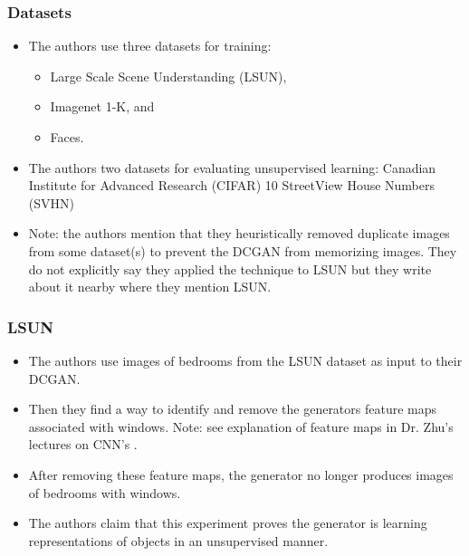 \documentclass{beamer}
\begin{document}
\begin{frame}[allowframebreaks]
\frametitle{Datasets}
\begin{itemize}
  \item The authors use three datasets for training:
  \begin{itemize}
    \item Large Scale Scene Understanding (LSUN),
    \item Imagenet 1-K, and
    \item Faces.
  \end{itemize}  
  \item The authors two datasets for evaluating unsupervised learning: Canadian 
    Institute for Advanced Research (CIFAR) 10 StreetView House Numbers (SVHN)
  \item Note: the authors mention that they heuristically removed duplicate
    images from some dataset(s) to prevent the DCGAN from memorizing images.
   They do not explicitly say they applied the technique to LSUN but they write
   about it nearby where they mention LSUN.
\end{itemize}
\end{frame}


\begin{frame}[allowframebreaks]
\frametitle{LSUN}
\begin{itemize}
  \item The authors use images of bedrooms from the LSUN dataset
  \cite{lsunDataset} as input to their DCGAN.

  \item Then they find a way to identify and remove the generators feature maps
  \cite{repLearnDcgan} associated with windows.  Note: see explanation of feature
  maps in Dr. Zhu's lectures on CNN's \cite{cnnlecture}. 

  \item After removing these feature maps, the generator no longer produces images
    of bedrooms with windows.

  \item The authors claim that this experiment proves the generator is learning
   representations of objects in an unsupervised manner. 
\end{itemize}
\end{frame}

\end{document}

